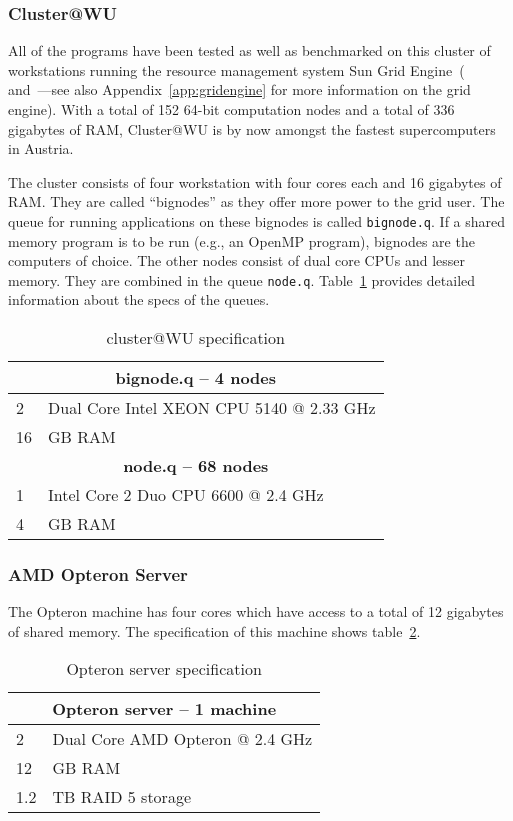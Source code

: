 \subsubsection{Cluster@WU}
All of the programs
have been tested as well as benchmarked on this cluster of
workstations running the resource management system Sun Grid 
Engine~(\cite{gentzsch02sge} and~\cite{sge07}---see also
Appendix~\ref{app:gridengine} for more information on the 
grid engine). With a total of 152 64-bit computation nodes and a total
of 336 gigabytes of RAM, Cluster@WU is by now amongst the fastest
supercomputers in Austria.

The cluster consists of four workstation with four cores each and 16
gigabytes of RAM. They are called ``bignodes'' as they offer more
power to the grid user. The queue for running applications on these
bignodes is called \texttt{bignode.q}. If a shared memory program is
to be run (e.g., an OpenMP program), bignodes are the computers of choice.
The other nodes consist of dual core CPUs and lesser
memory. They are combined in the queue
\texttt{node.q}. Table~\ref{tab:clusterWU} provides detailed
information about the specs of the queues.

\begin{table}[h!b!p!]
\caption{cluster@WU specification}
\centering
\label{tab:clusterWU}
\begin{tabular}{|l|l|}
\hline
\multicolumn{2}{|c|}{\textbf{bignode.q -- 4 nodes}}\\
\hline
2  & Dual Core Intel XEON CPU 5140 @ 2.33 GHz\\
16 & GB RAM\\
\hline
\multicolumn{2}{|c|}{\textbf{node.q -- 68 nodes}}\\
\hline
1 & Intel Core 2 Duo CPU 6600 @ 2.4 GHz\\
4 & GB RAM\\
\hline
\end{tabular}
\end{table}

\subsubsection{AMD Opteron Server}
The Opteron machine has four cores which
have access to a total of 12 gigabytes of shared memory. The
specification of this machine shows table~\ref{tab:opteronserver}.

\begin{table}[h!b!p!]
\centering
\caption{Opteron server specification}
\label{tab:opteronserver}
\begin{tabular}{|l|l|}
\hline
\multicolumn{2}{|c|}{\textbf{Opteron server -- 1 machine}}\\
\hline
2  & Dual Core AMD Opteron @ 2.4 GHz\\
12 & GB RAM\\
1.2& TB RAID 5 storage\\
\hline
\end{tabular}
\end{table}

